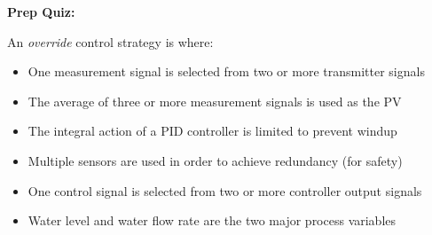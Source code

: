 \vfil \eject

\noindent
{\bf Prep Quiz:}

An {\it override} control strategy is where:

\begin{itemize}
\item{} One measurement signal is selected from two or more transmitter signals
\vskip 5pt 
\item{} The average of three or more measurement signals is used as the PV
\vskip 5pt 
\item{} The integral action of a PID controller is limited to prevent windup
\vskip 5pt 
\item{} Multiple sensors are used in order to achieve redundancy (for safety)
\vskip 5pt 
\item{} One control signal is selected from two or more controller output signals
\vskip 5pt 
\item{} Water level and water flow rate are the two major process variables 
\end{itemize}




